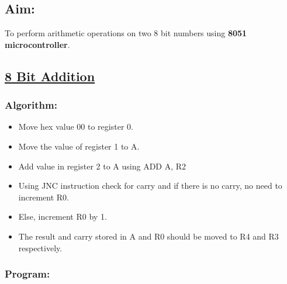 \documentclass[12pt,a4paper]{article}
\begin{document}
\begin{flushleft}
\subsection*{\textbf{Aim:}} 
To perform arithmetic operations on two 8 bit numbers using \textbf{8051 microcontroller}.

\subsection*{\textbf{\underline{8 Bit Addition}}}

\subsubsection*{\textbf{Algorithm:}}
\begin{itemize}
    \item Move hex value 00 to register 0. 
    \item Move the value of register 1 to A.
    \item Add value in register 2 to A using ADD A, R2
    \item Using JNC instruction check for carry and if there is no carry, no need to increment R0.
    \item Else, increment R0 by 1. 
    \item The result and carry stored in A and R0 should be moved to R4 and R3 respectively.
\end{itemize}

\newpage
\subsubsection*{\textbf{Program:}}


\end{flushleft}
\end{document}
